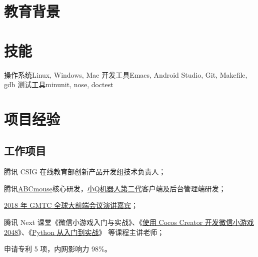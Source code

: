 
\section{\hei 教育背景}



\section{\hei 技能}

           {操作系统}{Linux, Windows, Mac}
           {开发工具}{Emacs, Android Studio, Git, Makefile, gdb}
           {测试工具}{minunit, nose, doctest}

\section{\hei 项目经验}


\subsection{\hei 工作项目}

{
  \begin{tightitemize}%
  \item 腾讯 CSIG 在线教育部创新产品开发组技术负责人；
  \item 腾讯\href{https://abcmouse.qq.com}{ABCmouse}核心研发，\href{https://qrobot.qq.com/}{小Q机器人第二代}客户端及后台管理端研发；
  \item \href{https://www.infoq.cn/article/QXiWs69g24PMk0ldg1to}{2018 年 GMTC 全球大前端会议演讲嘉宾}；
  \item 腾讯 Next 课堂《微信小游戏入门与实战》、《\href{https://ke.qq.com/course/350627?from=800004380}{使用 Cocos Creator 开发微信小游戏 2048}》、《\href{https://ke.qq.com/course/384790?tuin=1b8113f4}{Python 从入门到实战}》 等课程主讲老师；
  \item 申请专利 5 项，内网影响力 98\%。
  \end{tightitemize}}

